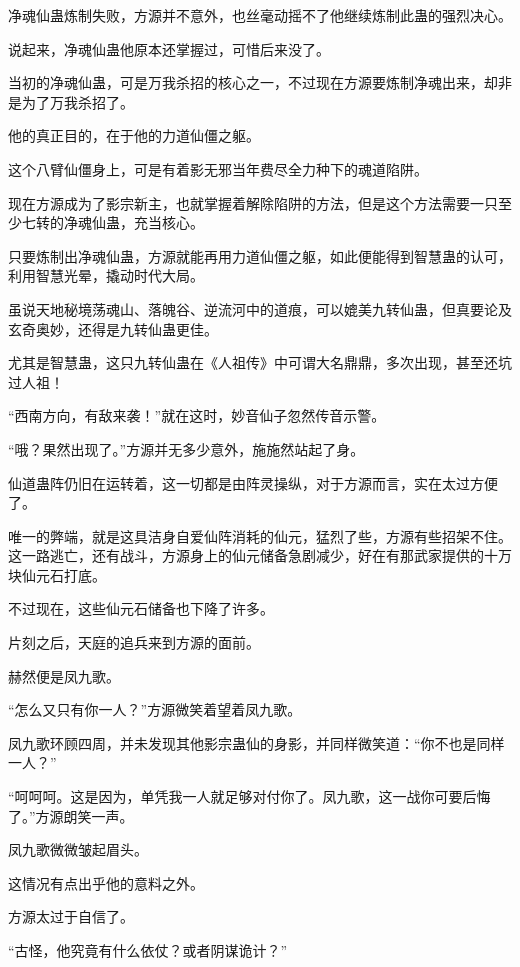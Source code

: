 \begin{this_body}
净魂仙蛊炼制失败，方源并不意外，也丝毫动摇不了他继续炼制此蛊的强烈决心。

说起来，净魂仙蛊他原本还掌握过，可惜后来没了。

当初的净魂仙蛊，可是万我杀招的核心之一，不过现在方源要炼制净魂出来，却非是为了万我杀招了。

他的真正目的，在于他的力道仙僵之躯。

这个八臂仙僵身上，可是有着影无邪当年费尽全力种下的魂道陷阱。

现在方源成为了影宗新主，也就掌握着解除陷阱的方法，但是这个方法需要一只至少七转的净魂仙蛊，充当核心。

只要炼制出净魂仙蛊，方源就能再用力道仙僵之躯，如此便能得到智慧蛊的认可，利用智慧光晕，撬动时代大局。

虽说天地秘境荡魂山、落魄谷、逆流河中的道痕，可以媲美九转仙蛊，但真要论及玄奇奥妙，还得是九转仙蛊更佳。

尤其是智慧蛊，这只九转仙蛊在《人祖传》中可谓大名鼎鼎，多次出现，甚至还坑过人祖！

“西南方向，有敌来袭！”就在这时，妙音仙子忽然传音示警。

“哦？果然出现了。”方源并无多少意外，施施然站起了身。

仙道蛊阵仍旧在运转着，这一切都是由阵灵操纵，对于方源而言，实在太过方便了。

唯一的弊端，就是这具洁身自爱仙阵消耗的仙元，猛烈了些，方源有些招架不住。这一路逃亡，还有战斗，方源身上的仙元储备急剧减少，好在有那武家提供的十万块仙元石打底。

不过现在，这些仙元石储备也下降了许多。

片刻之后，天庭的追兵来到方源的面前。

赫然便是凤九歌。

“怎么又只有你一人？”方源微笑着望着凤九歌。

凤九歌环顾四周，并未发现其他影宗蛊仙的身影，并同样微笑道：“你不也是同样一人？”

“呵呵呵。这是因为，单凭我一人就足够对付你了。凤九歌，这一战你可要后悔了。”方源朗笑一声。

凤九歌微微皱起眉头。

这情况有点出乎他的意料之外。

方源太过于自信了。

“古怪，他究竟有什么依仗？或者阴谋诡计？”

\end{this_body}

